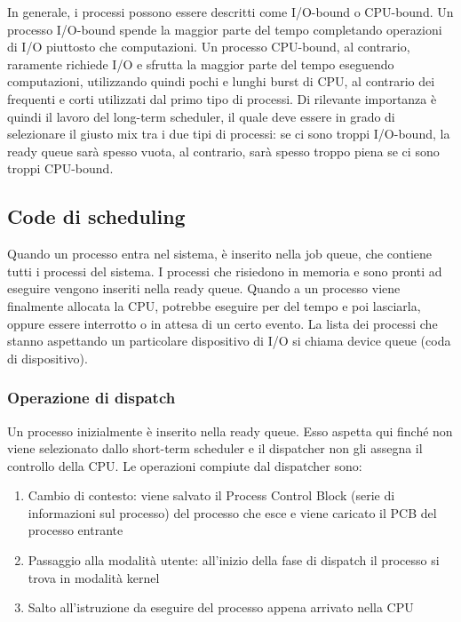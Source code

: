 \documentclass[a4paper]{article}
\begin{document}
In generale, i processi possono essere descritti come I/O-bound o CPU-bound. Un processo I/O-bound spende la maggior parte del tempo completando operazioni di I/O piuttosto che computazioni. Un processo CPU-bound, al contrario, raramente richiede I/O e sfrutta la maggior parte del tempo eseguendo computazioni, utilizzando quindi pochi e lunghi burst di CPU, al contrario dei frequenti e corti utilizzati dal primo tipo di processi. Di rilevante importanza è quindi il lavoro del long-term scheduler, il quale deve essere in grado di selezionare il giusto mix tra i due tipi di processi: se ci sono troppi I/O-bound, la ready queue sarà spesso vuota, al contrario, sarà spesso troppo piena se ci sono troppi CPU-bound.

\subsection{Code di scheduling}
Quando un processo entra nel sistema, è inserito nella job queue, che contiene tutti i processi del sistema. I processi che risiedono in memoria e sono pronti ad eseguire vengono inseriti nella ready queue. Quando a un processo viene finalmente allocata la CPU, potrebbe eseguire per del tempo e poi lasciarla, oppure essere interrotto o in attesa di un certo evento. La lista dei processi che stanno aspettando un particolare dispositivo di I/O si chiama device queue (coda di dispositivo).
\subsubsection{Operazione di dispatch}
Un processo inizialmente è inserito nella ready queue. Esso aspetta qui finché non viene selezionato dallo short-term scheduler e il dispatcher non gli assegna il controllo della CPU. Le operazioni compiute dal dispatcher sono:
\begin{enumerate}
    \item Cambio di contesto: viene salvato il Process Control Block (serie di informazioni sul processo) del processo che esce e viene caricato il PCB del processo entrante
    \item Passaggio alla modalità utente: all'inizio della fase di dispatch il processo si trova in modalità kernel
    \item Salto all'istruzione da eseguire del processo appena arrivato nella CPU
\end{enumerate}
\end{document}
